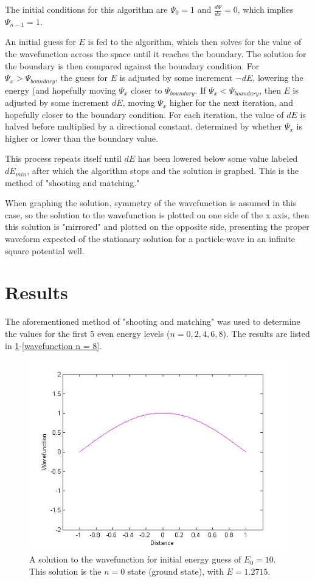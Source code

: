 \documentclass[12pt]{article}                  %
\begin{document}
The initial conditions for this algorithm are $\Psi_{0} = 1$ and $\frac{d\Psi}{dx} = 0$, which implies $\Psi_{n-1} = 1$. 

An initial guess for $E$ is fed to the algorithm, which then solves for the value of the wavefunction across the space until it reaches the boundary. The solution for the boundary is then compared against the boundary condition. For $\Psi_{x} > \Psi_{boundary}$, the guess for $E$ is adjusted by some increment $-dE$, lowering the energy (and hopefully moving $\Psi_{x}$ closer to $\Psi_{boundary}$. If $\Psi_{x} < \Psi_{boundary}$, then $E$ is adjusted by some increment $dE$, moving $\Psi_{x}$ higher for the next iteration, and hopefully closer to the boundary condition. For each iteration, the value of $dE$ is halved before multiplied by a directional constant, determined by whether $\Psi_{x}$ is higher or lower than the boundary value. 

This process repeats itself until $dE$ has been lowered below some value labeled $dE_{min}$, after which the algorithm stops and the solution is graphed. This is the method of "shooting and matching."

When graphing the solution, symmetry of the wavefunction is assumed in this case, so the solution to the wavefunction is plotted on one side of the x axis, then this solution is "mirrored" and plotted on the opposite side, presenting the proper waveform expected of the stationary solution for a particle-wave in an infinite square potential well. 

\pagebreak

\section{Results}
The aforementioned method of "shooting and matching" was used to determine the values for the first 5 even energy levels ($n = 0, 2, 4, 6, 8$). The results are listed in \ref{wavefunction n = 0}-\ref{wavefunction n = 8}. 

\begin{figure}[H]
\centering
\includegraphics[scale=0.45]{aogle_final_n_0.jpg}
\caption{A solution to the wavefunction for initial energy guess of $E_{0} = 10$. This solution is the $n = 0$ state (ground state), with $E = 1.2715$.}
\label{wavefunction n = 0}
\end{figure}
\end{document}
